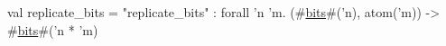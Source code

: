 val replicate_bits = "replicate_bits" : forall 'n 'm. (#\hyperref[zbits]{bits}#('n), atom('m)) -> #\hyperref[zbits]{bits}#('n * 'm)
